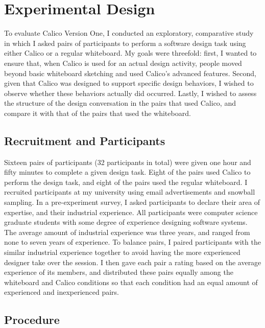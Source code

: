 \section{Experimental Design}
\label{experimentaldesign}

To evaluate Calico Version One, I conducted an exploratory, comparative study in which I asked pairs of participants to perform a software design task using either Calico or a regular whiteboard. My goals were threefold: first, I wanted to ensure that, when Calico is used for an actual design activity, people moved beyond basic whiteboard sketching and used Calico's advanced features. Second, given that Calico was designed to support specific design behaviors, I wished to observe whether these behaviors actually did occurred. Lastly, I wished to assess the structure of the design conversation in the pairs that used Calico, and compare it with that of the pairs that used the whiteboard.

\subsection {Recruitment and Participants}
\label{experimentaldesign:1}

Sixteen pairs of participants (32 participants in total) were given one hour and fifty minutes to complete a given design task. Eight of the pairs used Calico to perform the design task, and eight of the pairs used the regular whiteboard. 
I recruited participants at my university using email advertisements and snowball sampling. In a pre-experiment survey, I asked participants to declare their area of expertise, and their industrial experience. All participants were computer science graduate students with some degree of experience designing software systems. The average amount of industrial experience was three years, and ranged from none to seven years of experience. To balance pairs, I paired participants with the similar industrial experience together to avoid having the more experienced designer take over the session. I then gave each pair a rating based on the average experience of its members, and distributed these pairs equally among the whiteboard and Calico conditions so that each condition had an equal amount of experienced and inexperienced pairs.

\subsection {Procedure}
\label{experimentaldesign:2}

